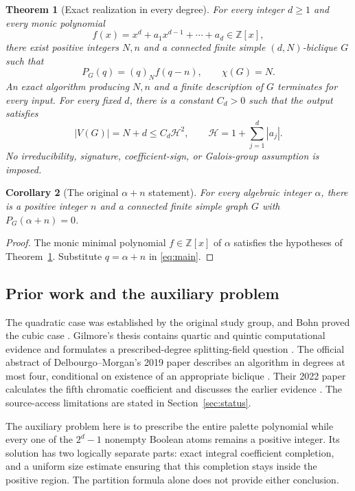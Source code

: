 \documentclass[11pt,a4paper]{article}
\newtheorem{theorem}{Theorem}[section]
\newtheorem{corollary}[theorem]{Corollary}
\theoremstyle{definition}
\newcommand{\Z}{\mathbb Z}
\newcommand{\fall}[2]{(#1)_{#2}}
\newcommand{\htf}{\mathcal H}
\begin{document}
\begin{theorem}[Exact realization in every degree]\label{thm:main}
For every integer $d\ge1$ and every monic polynomial
\[
 f(x)=x^d+a_1x^{d-1}+\cdots+a_d\in\Z[x],
\]
there exist positive integers $N,n$ and a connected finite simple
$(d,N)$-biclique $G$ such that
\begin{equation}\label{eq:main}
 P_G(q)=\fall qN f(q-n),\qquad \chi(G)=N.
\end{equation}
An exact algorithm producing $N,n$ and a finite description of $G$
terminates for every input. For every fixed $d$, there is a constant
$C_d>0$ such that the output satisfies
\begin{equation}\label{eq:size}
 |V(G)|=N+d\le C_d\htf^2,
 \qquad \htf=1+\sum_{j=1}^d|a_j|.
\end{equation}
No irreducibility, signature, coefficient-sign, or Galois-group assumption
is imposed.
\end{theorem}

\begin{corollary}[The original $\alpha+n$ statement]\label{cor:alpha}
For every algebraic integer $\alpha$, there is a positive integer $n$
and a connected finite simple graph $G$ with $P_G(\alpha+n)=0$.
\end{corollary}
\begin{proof}
The monic minimal polynomial $f\in\Z[x]$ of $\alpha$ satisfies the
hypotheses of Theorem~\ref{thm:main}. Substitute $q=\alpha+n$ in
\eqref{eq:main}.
\end{proof}

\subsection{Prior work and the auxiliary problem}

The quadratic case was established by the original study group, and
Bohn proved the cubic case \cite{CM,Bohn}. Gilmore's thesis contains
quartic and quintic computational evidence and formulates a
prescribed-degree splitting-field question \cite[Chapter 7]{Gilmore}.
The official abstract of Delbourgo--Morgan's 2019 paper describes an
algorithm in degrees at most four, conditional on existence of an
appropriate biclique \cite{DM19}. Their 2022 paper calculates the fifth
chromatic coefficient and discusses the earlier evidence \cite{DM22}.
The source-access limitations are stated in Section~\ref{sec:status}.

The auxiliary problem here is to prescribe the entire palette polynomial
while every one of the $2^d-1$ nonempty Boolean atoms remains a positive
integer. Its solution has two logically separate parts: exact integral
coefficient completion, and a uniform size estimate ensuring that this
completion stays inside the positive region. The partition formula alone
does not provide either conclusion.
\end{document}
